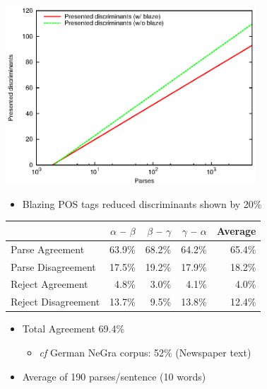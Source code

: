 \documentclass[a4paper,landscape,headrule,footrule,xetex]{foils}
\begin{document}
  \includegraphics[width=0.7\textwidth]{include/parse-decision-presented.eps}
\begin{itemize}
\item Blazing POS tags reduced discriminants shown by 20\%
\end{itemize}


  \begin{tabular}{l|rrr|r}
      & $\alpha$ -- $\beta$  &  $\beta$ -- $\gamma$ & $\gamma$ -- $\alpha$ 
        & \textbf{Average}\\
      \hline
      Parse Agreement & 63.9\% &  68.2\% &  64.2\% &  65.4\% \\  
      Parse Disagreement & 17.5\% &  19.2\% &  17.9\% &  18.2\% \\  
      Reject Agreement &  4.8\%  &   3.0\%  &   4.1\%  &   4.0\% \\  
      Reject Disagreement & 13.7\%  &   9.5\%  &  13.8\%  &  12.4\% \\  
    \end{tabular}
\begin{itemize}
   \item  Total Agreement 69.4\%\
     \begin{itemize}
     \item \textit{cf} German NeGra corpus: 52\% (Newspaper text)
     \end{itemize}
   \item Average of 190 parses/sentence (10 words)
   \end{itemize}

\end{document}
